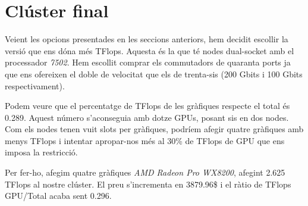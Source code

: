 \section{Clúster final}
Veient les opcions presentades en les seccions anteriors,  hem decidit escollir la versió que ens dóna més TFlops. Aquesta és la que té nodes dual-socket amb el processador \textit{7502}. Hem escollit comprar els commutadors de quaranta ports ja que ens ofereixen el doble de velocitat que els de trenta-sis (200 Gbits i 100 Gbits respectivament).

Podem veure que el percentatge de TFlops de les gràfiques respecte el total és 0.289. Aquest número s'aconseguia amb dotze GPUs, posant sis en dos nodes. Com els nodes tenen vuit slots per gràfiques, podríem afegir quatre gràfiques amb menys TFlops i intentar apropar-nos més al 30\% de TFlops de GPU que ens imposa la restricció.

Per fer-ho, afegim quatre gràfiques \textit{AMD Radeon Pro WX8200}, afegint 2.625 TFlops al nostre clúster. El preu s'incrementa en 3879.96\$ i el ràtio de TFlops GPU/Total acaba sent 0.296.

